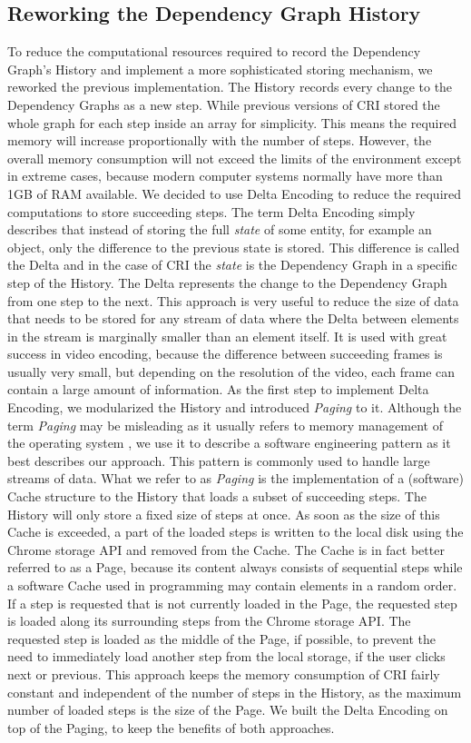 \subsection{Reworking the Dependency Graph History}
To reduce the computational resources required to record the Dependency Graph's History and implement a more sophisticated storing mechanism, we reworked the previous implementation. The History records every change to the Dependency Graphs as a new step. While previous versions of CRI stored the whole graph for each step inside an array for simplicity. This means the required memory will increase proportionally with the number of steps. However, the overall memory consumption will not exceed the limits of the environment except in extreme cases, because modern computer systems normally have more than 1GB of RAM available. We decided to use Delta Encoding to reduce the required computations to store succeeding steps. The term Delta Encoding simply describes that instead of storing the full \emph{state} of some entity, for example an object, only the difference to the previous state is stored. This difference is called the Delta and in the case of CRI the \emph{state} is the Dependency Graph in a specific step of the History. The Delta represents the change to the Dependency Graph from one step to the next. This approach is very useful to reduce the size of data that needs to be stored for any stream of data where the Delta between elements in the stream is marginally smaller than an element itself. It is used with great success in video encoding, because the difference between succeeding frames is usually very small, but depending on the resolution of the video, each frame can contain a large amount of information.
As the first step to implement Delta Encoding, we modularized the History and introduced \emph{Paging} to it. Although the term \emph{Paging} may be misleading as it usually refers to memory management of the operating system \cite{PagingWiki}, we use it to describe a software engineering pattern as it best describes our approach. This pattern is commonly used to handle large streams of data. What we refer to as \emph{Paging} is the implementation of a (software) Cache structure to the History that loads a subset of succeeding steps. The History will only store a fixed size of steps at once. As soon as the size of this Cache is exceeded, a part of the loaded steps is written to the local disk using the Chrome storage API and removed from the Cache. The Cache is in fact better referred to as a Page, because its content always consists of sequential steps while a software Cache used in programming may contain elements in a random order. If a step is requested that is not currently loaded in the Page, the requested step is loaded along its surrounding steps from the Chrome storage API. The requested step is loaded as the middle of the Page, if possible, to prevent the need to immediately load another step from the local storage, if the user clicks next or previous. This approach keeps the memory consumption of CRI fairly constant and independent of the number of steps in the History, as the maximum number of loaded steps is the size of the Page. We built the Delta Encoding on top of the Paging, to keep the benefits of both approaches.
